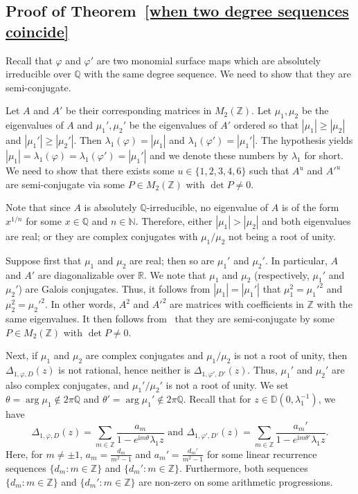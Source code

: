 \documentclass[11pt,a4paper]{article}
\theoremstyle{plain}
\theoremstyle{remark}
\theoremstyle{custombold}
\newcommand{\irm}{\mathrm{i}}
\begin{document}
\subsection{Proof of Theorem~\ref{when two degree sequences coincide}}
 

Recall that $\varphi$ and $\varphi'$ are two monomial surface maps which are absolutely irreducible over $\mathbb Q$ with the same degree sequence. We need to show that they are semi-conjugate.

     Let $A$ and $A'$ be their corresponding matrices in $M_2(\mathbb Z)$. Let $\mu_{1},\mu_{2}$ be the eigenvalues of $A$ and $\mu_{1}',\mu_{2}'$ be the eigenvalues of $A'$ ordered so that $|\mu_1|\geq|\mu_2|$ and $|\mu_1'|\geq|\mu_2'|$. Then  $\lambda_1(\varphi)=|\mu_{1}|$ and $\lambda_1(\varphi')=|\mu_{1}'|$. The hypothesis yields $|\mu_1|=\lambda_1(\varphi)=\lambda_1(\varphi')=|\mu_1'|$ and we denote these numbers by $\lambda_1$ for short. We need to show that there exists some $u \in \{1,2,3,4,6\}$ such that $A^u$ and ${A'}^u$ are semi-conjugate via some $P \in M_2(\mathbb{Z})$ with $\det P\neq0$.
     
     Note that since $A$ is absolutely $\mathbb Q$-irreducible, no eigenvalue of $A$ is of the form $x^{1/n}$ for some $x\in\mathbb Q$ and $n\in\mathbb N$. Therefore, either $|\mu_1|>|\mu_2|$ and both eigenvalues are real; or they are complex conjugates with $\mu_1/\mu_2$ not being a root of unity.

     Suppose first that $\mu_1$ and $\mu_2$ are real; then so are $\mu_1'$ and $\mu_2'$. In particular, $A$ and $A'$ are diagonalizable over $\mathbb R$. We note that $\mu_1$ and $\mu_2$ (respectively, $\mu_1'$ and $\mu_2'$) are Galois conjugates.  Thus, it follows from $|\mu_1|=|\mu_1'|$ that $\mu_1^2=\mu_1'^2$ and $\mu_2^2=\mu_2'^2$. In other words, $A^2$ and ${A'}^2$ are matrices with coefficients in $\mathbb Z$ with the same eigenvalues. It then follows from~\cite[A.VII.33 Corollary~3]{Bourbaki-algebraII} that they are semi-conjugate by some $P\in M_2(\mathbb Z)$ with $\det P\neq0$.
         
          
       Next, if $\mu_1$ and $\mu_2$ are complex conjugates and $\mu_1/\mu_2$ is not a root of unity, then $\Delta_{1,\varphi,D}(z)$ is not rational, hence neither is $\Delta_{1,\varphi',D'}(z)$. Thus, $\mu_1'$ and $\mu_2'$ are also complex conjugates, and $\mu_1'/\mu_2'$ is not a root of unity. We set $\theta=\arg\mu_1\not\in2\pi\mathbb Q$ and $\theta'=\arg\mu_1'\not\in2\pi\mathbb Q$. Recall that for $z\in\mathbb D(0,\lambda_1^{-1})$, we have 
            $$\Delta_{1,\varphi,D}(z)=\sum_{m\in\mathbb Z}\frac{a_{m}}{1-e^{\irm m\theta}\lambda_1 z}\text{ and }\Delta_{1,\varphi',D'}(z)=\sum_{m\in\mathbb Z}\frac{a_{m}'}{1-e^{\irm m\theta'}\lambda_1 z}.$$
Here, for $m\neq\pm1$, $a_m=\frac{d_m}{m^2-1}$ and $a_m'=\frac{d_m'}{m^2-1}$ for some linear recurrence sequences $\{d_m:m\in\mathbb Z\}$ and $\{d_m':m\in\mathbb Z\}$. Furthermore, both sequences $\{d_m:m\in\mathbb Z\}$ and $\{d_m':m\in\mathbb Z\}$ are non-zero on some arithmetic progressions.
        
\end{document}
